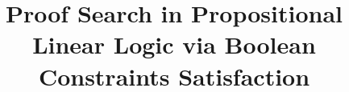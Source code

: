 \documentclass[a4paper, 12pt, english]{report}
\date{}
\title{Proof Search in Propositional Linear Logic via Boolean Constraints Satisfaction}
\begin{document}
\frontespizio

\blankpage

\beforepreface
\afterpreface








\appendix





\end{document}

